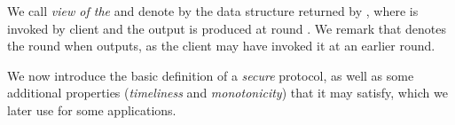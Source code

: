 \begin{definition}
    We call \emph{view of the} \podtm and denote by \podView{\client}{\round} the data structure returned by \opreadall{}, where \opreadall{} is invoked by client \client and the output is produced at round \round.
    We remark that \round denotes the round when \opreadall{} outputs, as the client may have invoked it at an earlier round.
\end{definition}

We now introduce the basic definition of a \emph{secure} \podtm protocol, as well as some additional properties (\emph{timeliness} and \emph{monotonicity}) that it may satisfy, which we later use for some applications.

